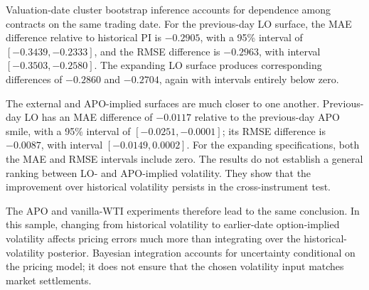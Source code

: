 Valuation-date cluster bootstrap inference accounts for dependence among contracts on the same trading date. For the previous-day LO surface, the MAE difference relative to historical PI is $-0.2905$, with a 95\% interval of $[-0.3439,-0.2333]$, and the RMSE difference is $-0.2963$, with interval $[-0.3503,-0.2580]$. The expanding LO surface produces corresponding differences of $-0.2860$ and $-0.2704$, again with intervals entirely below zero.

The external and APO-implied surfaces are much closer to one another. Previous-day LO has an MAE difference of $-0.0117$ relative to the previous-day APO smile, with a 95\% interval of $[-0.0251,-0.0001]$; its RMSE difference is $-0.0087$, with interval $[-0.0149,0.0002]$. For the expanding specifications, both the MAE and RMSE intervals include zero. The results do not establish a general ranking between LO- and APO-implied volatility. They show that the improvement over historical volatility persists in the cross-instrument test.

The APO and vanilla-WTI experiments therefore lead to the same conclusion. In this sample, changing from historical volatility to earlier-date option-implied volatility affects pricing errors much more than integrating over the historical-volatility posterior. Bayesian integration accounts for uncertainty conditional on the pricing model; it does not ensure that the chosen volatility input matches market settlements.

